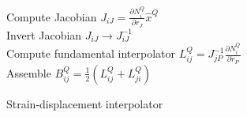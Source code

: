 \begin{algorithm}[H]
\SetAlgoLined
{}
Compute Jacobian ${J_{iJ}} = \frac{{\partial N_i^Q}}{{\partial {r_J}}}{{\hat x}^Q}$\\
Invert Jacobian  ${J_{iJ}} \to J_{iJ}^{ - 1}$\\
Compute fundamental interpolator $L_{ij}^Q = J_{jP}^{ - 1}\frac{{\partial N_i^Q}}{{\partial {r_P}}}$\\
Assemble $B_{ij}^Q = \frac{1}{2}\left( {L_{ij}^Q + L_{ji}^Q} \right)$ 
\caption{Strain-displacement interpolator}
\end{algorithm}


